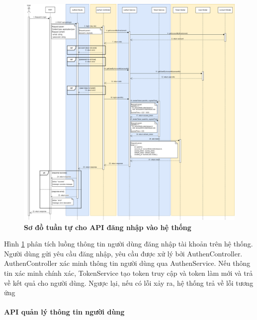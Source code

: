 \begin{figure}[H]
  \centering
  \includegraphics[scale=0.3]{Images/sequence_api/login.png}
  \caption[Sơ đồ tuần tự cho API đăng nhập vào hệ thống]{\bfseries \fontsize{12pt}{0pt}
  \selectfont Sơ đồ tuần tự cho API đăng nhập vào hệ thống }
  \label{api_login} %
\end{figure}
Hình \ref{api_login}  phân tích luồng thông tin người dùng đăng nhập tài khoản trên hệ thống. Người dùng gửi yêu cầu đăng nhập, yêu cầu được xử lý bởi AuthenController. AuthenController xác minh thông tin người dùng qua AuthenService. Nếu 
thông tin xác minh chính xác,  TokenService tạo token truy cập và token làm mới và trả về kết quả cho người dùng. Ngược lại, nếu có lỗi xảy ra, hệ thống trả về lỗi tương ứng





\paragraph{API quản lý thông tin người dùng}
\mbox{}

